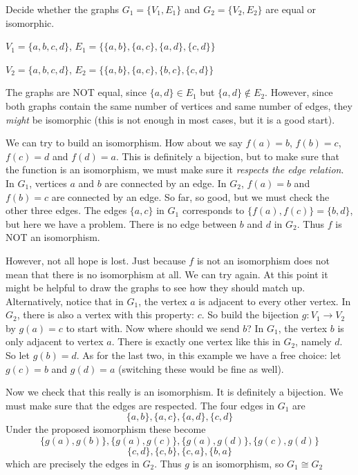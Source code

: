 \documentclass[12pt]{article}
\begin{document}
\begin{example}
Decide whether the graphs $G_1 = \{V_1, E_1\}$ and $G_2 = \{V_2, E_2\}$ are equal or isomorphic.

$V_1 = \{a,b,c,d\}$, $E_1 = \{\{a,b\}, \{a,c\}, \{a,d\}, \{c,d\}\}$

$V_2 = \{a,b,c,d\}$, $E_2 = \{\{a,b\}, \{a,c\}, \{b,c\}, \{c,d\}\}$

\begin{solution}
The graphs are NOT equal, since $\{a,d\} \in E_1$ but $\{a,d\} \notin E_2$.  However, since both graphs contain the same number of vertices and same number of edges, they \emph{might} be isomorphic (this is not enough in most cases, but it is a good start).  

We can try to build an isomorphism.  How about we say $f(a) = b$, $f(b) = c$, $f(c) = d$ and $f(d) = a$.  This is definitely a bijection, but to make sure that the function is an isomorphism, we must make sure it \emph{respects the edge relation}.  In $G_1$, vertices $a$ and $b$ are connected by an edge.  In $G_2$, $f(a) = b$ and $f(b) = c$ are connected by an edge.  So far, so good, but we must check the other three edges.  The edges $\{a,c\}$ in $G_1$ corresponds to $\{f(a), f(c)\} = \{b,d\}$, but here we have a problem.  There is no edge between $b$ and $d$ in $G_2$.  Thus $f$ is NOT an isomorphism.

However, not all hope is lost.  Just because $f$ is not an isomorphism does not mean that there is no isomorphism at all.  We can try again.  At this point it might be helpful to draw the graphs to see how they should match up.  Alternatively, notice that in $G_1$, the vertex $a$ is adjacent to every other vertex.  In $G_2$, there is also a vertex with this property: $c$.  So build the bijection $g:V_1 \to V_2$ by $g(a) = c$ to start with.  Now where should we send $b$?  In $G_1$, the vertex $b$ is only adjacent to vertex $a$.  There is exactly one vertex like this in $G_2$, namely $d$.  So let $g(b) = d$.  As for the last two, in this example we have a free choice: let $g(c) = b$ and $g(d) = a$ (switching these would be fine as well).   

Now we check that this really is an isomorphism.  It is definitely a bijection.  We must make sure that the edges are respected.  The four edges in $G_1$ are
\[\{a,b\}, \{a,c\}, \{a,d\}, \{c,d\}\]
Under the proposed isomorphism these become
\[\{g(a), g(b)\}, \{g(a), g(c)\}, \{g(a), g(d)\}, \{g(c), g(d)\}\]
\[ \{c,d\}, \{c,b\}, \{c,a\}, \{b,a\}\]
which are precisely the edges in $G_2$.  Thus $g$ is an isomorphism, so $G_1 \cong G_2$

\end{solution}
\end{example}
\end{document}

